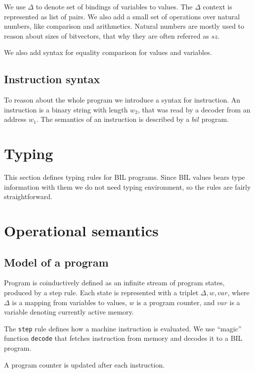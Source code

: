 \documentclass[11pt]{article}
\begin{document}
We use $\Delta$ to denote set of bindings of variables to values. The
$\Delta$ context is represented as list of pairs. We also add a small
set of operations over natural numbers, like comparison and
arithmetics. Natural numbers are mostly used to reason about sizes of
bitvectors, that why they are often referred as $\mathit{sz}$.

We also add syntax for equality comparison for values and variables.


\ottgrammartabular{
\ottdelta\ottinterrule
}

\ottgrammartabular{
\ottformula\ottinterrule
}

\ottgrammartabular{
\ottnat\ottinterrule
}

\subsection{Instruction syntax}
\label{sec:insn}

To reason about the whole program we introduce a syntax for
instruction. An instruction is a binary string with length
$\mathit{w_2}$, that was read by a decoder from an address
$\mathit{w_1}$. The semantics of an instruction is described by a
$\mathit{bil}$ program.

\ottgrammartabular{
\ottinsn\ottinterrule
}

\section{Typing}
\label{sec:typing}

This section defines typing rules for BIL programs. Since BIL values
bears type information with them we do not need typing environment, so
the rules are fairly straightforward.

\ottdefnstypingXXstmt

\ottdefnstypingXXexp


\section{Operational semantics}

\subsection{Model of a program}

Program is coinductively defined as an infinite stream of program
states, produced by a step rule. Each state is represented with a
triplet $\Delta, w, var$, where $\Delta$ is a mapping from variables
to values, $w$ is a program counter, and $var$ is a variable
denoting currently active memory.

The \verb|step| rule defines how a machine instruction is
evaluated. We use ``magic'' function \verb|decode| that fetches
instruction from memory and decodes it to a BIL program.

A program counter is updated after each instruction.

\ottdefnsprogram
\end{document}
